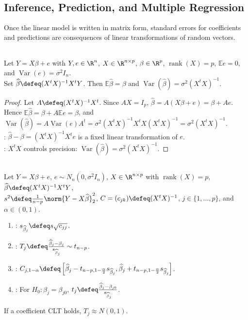 \subsection{Inference, Prediction, and Multiple Regression}

Once the linear model is written in matrix form, standard errors for coefficients and predictions are consequences of linear transformations of random vectors.

\begin{theorem} \label{thm:linear-model-beta-hat-mean-covariance} \\
Let $Y=X\beta+e$ with $Y,e\in\R^n$, $X\in\R^{n\times p}$, $\beta\in\R^p$, $\operatorname{rank}(X)=p$, $\mathbb{E}e=0$, and $\operatorname{Var}(e)=\sigma^2I_n$.\\
Set $\widehat{\beta}\defeq(X^tX)^{-1}X^tY$. Then $\mathbb{E}\widehat{\beta}=\beta$ and $\operatorname{Var}(\widehat{\beta})=\sigma^2(X^tX)^{-1}$.
\begin{proof} Let $A\defeq(X^tX)^{-1}X^t$. Since $AX=I_p$, $\widehat{\beta}=A(X\beta+e)=\beta+Ae$.\\
Hence $\mathbb{E}\widehat{\beta}=\beta+A\mathbb{E}e=\beta$, and $\operatorname{Var}(\widehat{\beta})=A\operatorname{Var}(e)A^t=\sigma^2(X^tX)^{-1}X^tX(X^tX)^{-1}=\sigma^2(X^tX)^{-1}$.\\
: $\widehat{\beta}-\beta=(X^tX)^{-1}X^te$ is a fixed linear transformation of $e$.\\
: $X^tX$ controls precision: $\operatorname{Var}(\widehat{\beta})=\sigma^2(X^tX)^{-1}$.
\end{proof}
\end{theorem}

\begin{method} \label{meth:linear-model-coefficient-inference} \\
Let $Y=X\beta+e$, $e\sim N_n(0,\sigma^2I_n)$, $X\in\R^{n\times p}$ with $\operatorname{rank}(X)=p$, $\widehat{\beta}\defeq(X^tX)^{-1}X^tY$,\\
$s^2\defeq\frac{1}{n-p}\norm{Y-X\widehat{\beta}}_2^2$, $C=(c_{jk})\defeq(X^tX)^{-1}$, $j\in\{1,\ldots,p\}$, and $\alpha\in(0,1)$.
\begin{enumerate}[label=(\roman*)]
\setlength{\itemsep}{0pt}
\item {}: $s_{\widehat{\beta}_j}\defeq s\sqrt{c_{jj}}$.
\item {}: $T_j\defeq\frac{\widehat{\beta}_j-\beta_j}{s_{\widehat{\beta}_j}}\sim t_{n-p}$.
\item {}: $C_{j,1-\alpha}\defeq\left[\widehat{\beta}_j-t_{n-p,1-\frac{\alpha}{2}}s_{\widehat{\beta}_j},\widehat{\beta}_j+t_{n-p,1-\frac{\alpha}{2}}s_{\widehat{\beta}_j}\right]$.
\item {}: For $H_0:\beta_j=\beta_{j0}$, $t_j\defeq\frac{\widehat{\beta}_j-\beta_{j0}}{s_{\widehat{\beta}_j}}$.
\end{enumerate}
If a coefficient CLT holds, $T_j\approx N(0,1)$.
\end{method}

